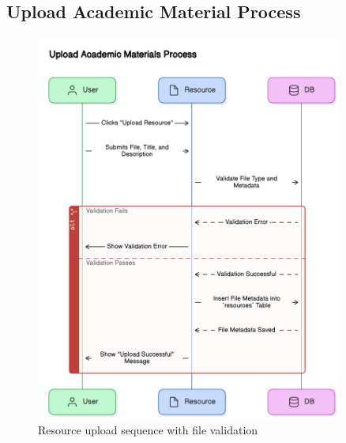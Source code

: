\subsection{Upload Academic Material Process}
\begin{figure}[H]
    \centering
    \includegraphics[width=0.9\textwidth]{images/sequence_diagrams/upload_academic_material_process.png}
    \caption{Resource upload sequence with file validation}
    \label{fig:upload_material}
\end{figure}

